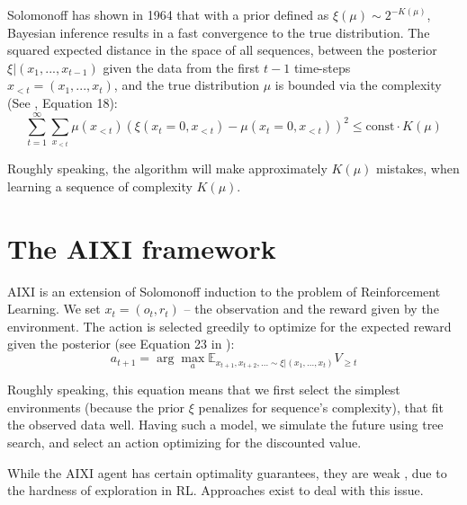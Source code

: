 \documentclass[a4paper,11pt,oneside]{report}
\begin{document}
Solomonoff has shown in 1964 that with a prior defined as $\xi(\mu)\sim 2^{-K(\mu)}$, Bayesian inference results in a fast convergence to the true distribution. The squared expected distance in the space of all sequences, between the posterior $\xi|(x_1,...,x_{t-1})$ given the data from the first $t-1$ time-steps $x_{< t}=(x_1,...,x_t)$, and the true distribution $\mu$ is bounded via the complexity (See \cite{Hutter2003}, Equation 18):
$$
\sum\limits_{t=1}^{\infty}\sum\limits_{x_{<t}}\mu(x_{<t})\left(\xi(x_t=0,x_{<t})-\mu(x_t=0,x_{<t})\right)^2\leq  \mbox{const}\cdot K(\mu)
$$

Roughly speaking, the algorithm will make approximately $K(\mu)$ mistakes, when learning a sequence of complexity $K(\mu)$.

\section{The AIXI framework}
\label{subsec:aixi}
AIXI \cite{Hutter2003} is an extension of Solomonoff induction to the problem of Reinforcement Learning. We set $x_t=(o_t,r_t)$ -- the observation and the reward given by the environment. The action is selected greedily to optimize for the expected reward given the posterior (see Equation 23 in \cite{Hutter2003}):
$$
a_{t+1}=\arg\max\limits_{a}\mathbb E_{x_{t+1},x_{t+2},...\sim \xi|(x_1,...,x_t)}V_{\geq t}
$$

Roughly speaking, this equation means that we first select the simplest environments (because the prior $\xi$ penalizes for sequence's complexity), that fit the observed data well. Having such a model, we simulate the future using tree search, and select an action optimizing for the discounted value.

While the AIXI agent has certain optimality guarantees, they are weak \cite{leike2015bad}, due to the hardness of exploration in RL. Approaches \cite{leike2016thompson} exist to deal with this issue.
%
%


\cleardoublepage
{}
{}


\end{document}

